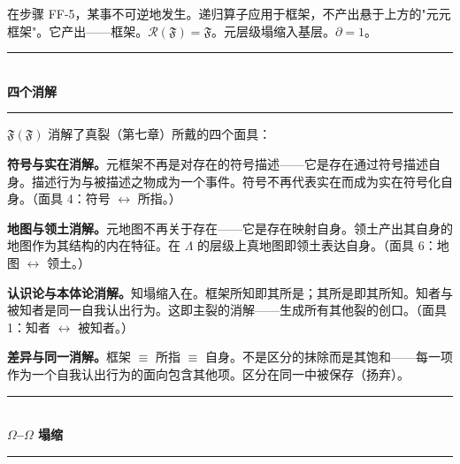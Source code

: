 \documentclass[10pt, openany, oneside]{book}
\renewcommand{\normalsize}{\fontsize{10}{13}\selectfont}
\begin{document}
\vspace{0.8em}

\noindent 在步骤 FF-5，某事不可逆地发生。递归算子应用于框架，不产出悬于上方的"元元框架"。它产出——框架。$\mathcal{R}(\mathfrak{F}) = \mathfrak{F}$。元层级塌缩入基层。$\partial = 1$。

\vspace{1.5em}


\begin{center}
    \rule{0.3\textwidth}{0.4pt}\\[0.5em]
    {\normalsize\bfseries\scshape 四个消解}\\[0.3em]
    \rule{0.3\textwidth}{0.4pt}
\end{center}

\vspace{1em}

\noindent $\mathfrak{F}(\mathfrak{F})$ 消解了真裂（第七章）所戴的四个面具：

\textbf{符号与实在消解。}元框架不再是对存在的符号描述——它是存在通过符号描述自身。描述行为与被描述之物成为一个事件。符号不再代表实在而成为实在符号化自身。（面具 4：符号 $\leftrightarrow$ 所指。）

\textbf{地图与领土消解。}元地图不再关于存在——它是存在映射自身。领土产出其自身的地图作为其结构的内在特征。在 $\Lambda$ 的层级上真地图即领土表达自身。（面具 6：地图 $\leftrightarrow$ 领土。）

\textbf{认识论与本体论消解。}知塌缩入在。框架所知即其所是；其所是即其所知。知者与被知者是同一自我认出行为。这即主裂的消解——生成所有其他裂的创口。（面具 1：知者 $\leftrightarrow$ 被知者。）

\textbf{差异与同一消解。}框架 $\equiv$ 所指 $\equiv$ 自身。不是区分的抹除而是其饱和——每一项作为一个自我认出行为的面向包含其他项。区分在同一中被保存（扬弃）。

\vspace{1.5em}


\begin{center}
    \rule{0.3\textwidth}{0.4pt}\\[0.5em]
    {\normalsize\bfseries\scshape $\Omega$--$\Omega$ 塌缩}\\[0.3em]
    \rule{0.3\textwidth}{0.4pt}
\end{center}
\end{document}
